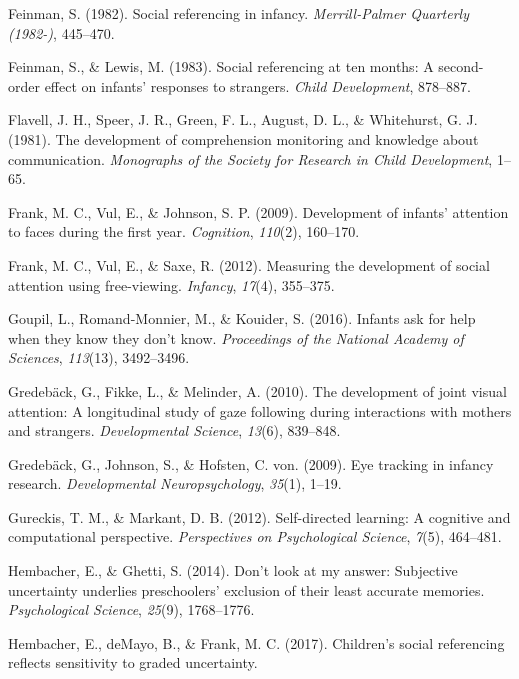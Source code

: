 \documentclass[floatsintext,man]{apa6}
\theoremstyle{definition}
\theoremstyle{definition}
\theoremstyle{definition}
\theoremstyle{remark}
\begin{document}
\hypertarget{ref-feinman1982social}{}
Feinman, S. (1982). Social referencing in infancy. \emph{Merrill-Palmer
Quarterly (1982-)}, 445--470.

\hypertarget{ref-feinman1983social}{}
Feinman, S., \& Lewis, M. (1983). Social referencing at ten months: A
second-order effect on infants' responses to strangers. \emph{Child
Development}, 878--887.

\hypertarget{ref-flavell1981development}{}
Flavell, J. H., Speer, J. R., Green, F. L., August, D. L., \&
Whitehurst, G. J. (1981). The development of comprehension monitoring
and knowledge about communication. \emph{Monographs of the Society for
Research in Child Development}, 1--65.

\hypertarget{ref-frank2009development}{}
Frank, M. C., Vul, E., \& Johnson, S. P. (2009). Development of infants'
attention to faces during the first year. \emph{Cognition},
\emph{110}(2), 160--170.

\hypertarget{ref-frank2012measuring}{}
Frank, M. C., Vul, E., \& Saxe, R. (2012). Measuring the development of
social attention using free-viewing. \emph{Infancy}, \emph{17}(4),
355--375.

\hypertarget{ref-goupil2016infants}{}
Goupil, L., Romand-Monnier, M., \& Kouider, S. (2016). Infants ask for
help when they know they don't know. \emph{Proceedings of the National
Academy of Sciences}, \emph{113}(13), 3492--3496.

\hypertarget{ref-gredeback2010development}{}
Gredebäck, G., Fikke, L., \& Melinder, A. (2010). The development of
joint visual attention: A longitudinal study of gaze following during
interactions with mothers and strangers. \emph{Developmental Science},
\emph{13}(6), 839--848.

\hypertarget{ref-gredeback2009eye}{}
Gredebäck, G., Johnson, S., \& Hofsten, C. von. (2009). Eye tracking in
infancy research. \emph{Developmental Neuropsychology}, \emph{35}(1),
1--19.

\hypertarget{ref-gureckis2012self}{}
Gureckis, T. M., \& Markant, D. B. (2012). Self-directed learning: A
cognitive and computational perspective. \emph{Perspectives on
Psychological Science}, \emph{7}(5), 464--481.

\hypertarget{ref-hembacher2014don}{}
Hembacher, E., \& Ghetti, S. (2014). Don't look at my answer: Subjective
uncertainty underlies preschoolers' exclusion of their least accurate
memories. \emph{Psychological Science}, \emph{25}(9), 1768--1776.

\hypertarget{ref-hembacherchildren}{}
Hembacher, E., deMayo, B., \& Frank, M. C. (2017). Children's social
referencing reflects sensitivity to graded uncertainty.
\end{document}
